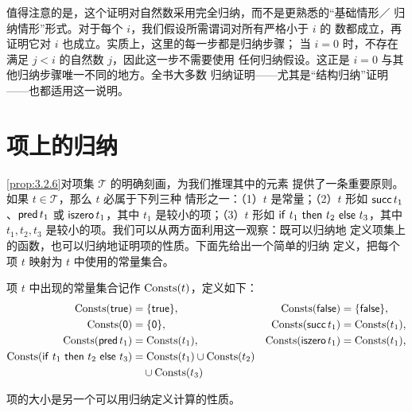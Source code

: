 值得注意的是，这个证明对自然数采用完全归纳，而不是更熟悉的“基础情形／
归纳情形”形式。对于每个 \(i\)，我们假设所需谓词对所有严格小于 \(i\) 的
数都成立，再证明它对 \(i\) 也成立。实质上，这里的每一步都是归纳步骤；
当 \(i=0\) 时，不存在满足 \(j<i\) 的自然数 \(j\)，因此这一步不需要使用
任何归纳假设。这正是 \(i=0\) 与其他归纳步骤唯一不同的地方。全书大多数
归纳证明——尤其是“结构归纳”证明——也都适用这一说明。

\section{项上的归纳}
\label{sec:3.3}

\cref{prop:3.2.6}对项集 \(\mathcal{T}\) 的明确刻画，为我们推理其中的元素
提供了一条重要原则。如果 \(t\in\mathcal{T}\)，那么 \(t\) 必属于下列三种
情形之一：（1）\(t\) 是常量；（2）\(t\) 形如
\(\mathsf{succ}\,t_1\)、\(\mathsf{pred}\,t_1\) 或 \(\mathsf{iszero}\,t_1\)，其中
\(t_1\) 是较小的项；（3）\(t\) 形如 \(\mathsf{if}\ t_1\ \mathsf{then}\ t_2\ \mathsf{else}\ t_3\)，其中
\(t_1,t_2,t_3\) 是较小的项。我们可以从两方面利用这一观察：既可以归纳地
定义项集上的函数，也可以归纳地证明项的性质。下面先给出一个简单的归纳
定义，把每个项 \(t\) 映射为 \(t\) 中使用的常量集合。

\begin{definition}
\label{def:3.3.1}
项 \(t\) 中出现的常量集合记作 \(\operatorname{Consts}(t)\)，定义如下：
\[
\begin{aligned}
 \operatorname{Consts}(\mathsf{true}) &= \{\mathsf{true}\},&
 \operatorname{Consts}(\mathsf{false}) &= \{\mathsf{false}\},\\
 \operatorname{Consts}(\mathsf{0}) &= \{\mathsf{0}\},&
 \operatorname{Consts}(\mathsf{succ}\,t_1) &= \operatorname{Consts}(t_1),\\
 \operatorname{Consts}(\mathsf{pred}\,t_1) &= \operatorname{Consts}(t_1),&
 \operatorname{Consts}(\mathsf{iszero}\,t_1) &= \operatorname{Consts}(t_1),\\
 \operatorname{Consts}(\mathsf{if}\ t_1\ \mathsf{then}\ t_2\ \mathsf{else}\ t_3)
   &= \operatorname{Consts}(t_1)\cup\operatorname{Consts}(t_2)\\
   &\quad{}\cup\operatorname{Consts}(t_3)
\end{aligned}
\]
\end{definition}

项的大小是另一个可以用归纳定义计算的性质。

